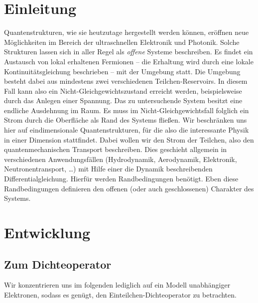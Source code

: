 \chapter{Einleitung}
Quantenstrukturen, wie sie heutzutage hergestellt werden können, eröffnen neue Möglichkeiten im Bereich der ultraschnellen Elektronik und Photonik. Solche Strukturen lassen sich in aller Regel als \emph{offene} Systeme beschreiben. Es findet ein Austausch von lokal erhaltenen Fermionen -- die Erhaltung wird durch eine lokale Kontinuitätsgleichung beschrieben -- mit der Umgebung statt. Die Umgebung besteht dabei aus mindestens zwei verschiedenen Teilchen-Reservoirs. In diesem Fall kann also ein Nicht-Gleichgewichtszustand erreicht werden, beispielsweise durch das Anlegen einer Spannung. Das zu untersuchende System besitzt eine endliche Ausdehnung im Raum. Es muss im Nicht-Gleichgewichtsfall folglich ein Strom durch die Oberfläche als Rand des Systems fließen. Wir beschränken uns hier auf eindimensionale Quantenstrukturen, für die also die interessante Physik in einer Dimension stattfindet. Dabei wollen wir den Strom der Teilchen, also den quantenmechanischen Transport beschreiben. Dies geschieht allgemein in verschiedenen Anwendungsfällen (Hydrodynamik, Aerodynamik, Elektronik, Neutronentransport, \dots) mit Hilfe einer die Dynamik beschreibenden Differentialgleichung. Hierfür werden Randbedingungen benötigt. Eben diese Randbedingungen definieren den offenen (oder auch geschlossenen) Charakter des Systems.

\chapter{Entwicklung}

\section{Zum Dichteoperator}
Wir konzentrieren uns im folgenden lediglich auf ein Modell unabhängiger Elektronen, sodass es genügt, den Einteilchen-Dichteoperator zu betrachten.

